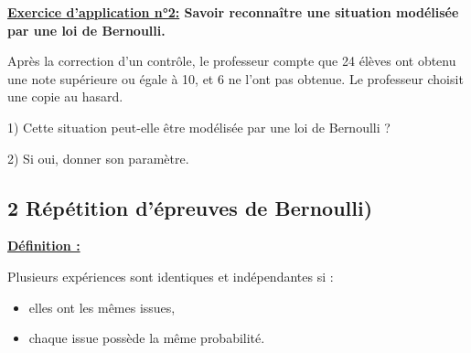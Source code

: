 \documentclass[12pt]{article}
\begin{document}
\begin{mdframed}[
    linewidth=1pt,
    roundcorner=5pt,
    linecolor=RoyalBlue,
    innertopmargin=10pt,
    innerbottommargin=10pt
]
{\color{RoyalBlue}
\textbf{\underline{Exercice d'application n°2:} Savoir reconnaître une situation modélisée par une loi 
de Bernoulli.}}

\vspace{5pt}
Après la correction d’un contrôle, le professeur compte que 24 élèves ont obtenu une note
supérieure ou égale à 10, et 6 ne l’ont pas obtenue.
Le professeur choisit une copie au hasard.

\hspace{1cm}1) Cette situation peut-elle être modélisée par une loi de Bernoulli ?

\hspace{1cm}2) Si oui, donner son paramètre.

\vspace{0.5cm}
{\color{black!40}\dotfill}

\vspace{0.5cm}
{\color{black!40}\dotfill}

\vspace{0.5cm}
{\color{black!40}\dotfill}

\vspace{0.5cm}
{\color{black!40}\dotfill}

\vspace{0.5cm}
{\color{black!40}\dotfill}


\vspace{20pt}

\end{mdframed}

\vspace{10pt}
\subsection*{\hspace{1cm} 2 Répétition d'épreuves de Bernoulli) }

\vspace{5pt}
\begin{mdframed}[
    linewidth=1pt,
    roundcorner=5pt,
    linecolor=ForestGreen,
    innertopmargin=10pt,
    innerbottommargin=10pt
]
{\color{ForestGreen}
\textbf{\underline{Définition :}}}

\vspace{5pt}
Plusieurs expériences sont identiques et indépendantes si : 
\begin{itemize}
    \item elles ont les mêmes issues,
    \item chaque issue possède la même probabilité.
\end{itemize}

\end{mdframed}
\end{document}
